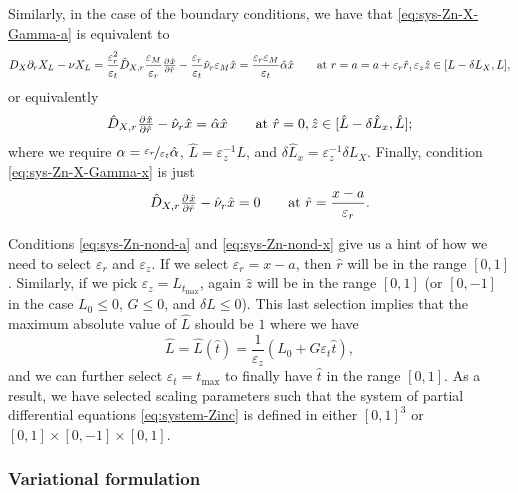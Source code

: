 \documentclass[a4paper,doc,11pt]{article}
\begin{document}
Similarly, in the case of the boundary conditions, we have that \eqref{eq:sys-Zn-X-Gamma-a} is equivalent to
\[
    D_X \partial_r X_L - \nu X_L = 
    \frac{\varepsilon_r^2}{\varepsilon_t} \hat{D}_{X,r} \frac{\varepsilon_M}{\varepsilon_r} \pd{\hat{x}}{\hat{r}} - \frac{\varepsilon_r}{\varepsilon_t} \hat{\nu}_r \varepsilon_M \hat{x} = \frac{\varepsilon_r \varepsilon_M}{\varepsilon_t} \hat{\alpha} \hat{x}
    \qquad \text{at } r = a = a + \varepsilon_r \hat{r}, \varepsilon_z \hat{z} \in [L - \delta L_X, L],
\]
or equivalently
\begin{equation}
    \label{eq:sys-Zn-nond-a}
    \hat{D}_{X,r} \pd{\hat{x}}{\hat{r}} - \hat{\nu}_r \hat{x} = \hat{\alpha} \hat{x}
    \qquad \text{at } \hat{r} = 0, \hat{z} \in [\hat{L} - \delta \hat{L}_x, \hat{L}];
\end{equation}
where we require \( \alpha = \nicefrac{\varepsilon_r}{\varepsilon_t} \hat{\alpha}\), \( \hat{L} = \varepsilon_z^{-1} L\), and \( \delta\hat{L}_x = \varepsilon_z^{-1} \delta L_X\). Finally, condition \eqref{eq:sys-Zn-X-Gamma-x} is just
\begin{equation}
    \label{eq:sys-Zn-nond-x}
    \hat{D}_{X,r} \pd{\hat{x}}{\hat{r}} - \hat{\nu}_r \hat{x} = 0
    \qquad \text{at } \hat{r} = \frac{x-a}{\varepsilon_r}.
\end{equation}

Conditions \eqref{eq:sys-Zn-nond-a} and \eqref{eq:sys-Zn-nond-x} give us a hint of how we need to select \(\varepsilon_r\) and \(\varepsilon_z\). If we select \( \varepsilon_r = x-a\), then \( \hat{r} \) will be in the range \( [0,1]\). Similarly, if we pick \( \varepsilon_z = L_{t_{\max}}\), again \(\hat z \) will be in the range \( [0,1]\) (or \([0,-1]\) in the case \(L_0 \leq 0\), \( G\leq 0\), and \(\delta L \leq 0\)). This last selection implies that the maximum absolute value of \( \hat{L}\) should be \(1\) where we have
\[
    \hat{L} = \hat{L}(\hat t) = \frac{1}{\varepsilon_z} ( L_0 + G \varepsilon_t \hat t ),
\]
and we can further select \( \varepsilon_t = t_{\max}\) to finally have \( \hat t\) in the range \( [0,1]\). As a result, we have selected scaling parameters such that the system of partial differential equations  \eqref{eq:system-Zinc} is defined in either \( [0,1]^3\) or \([0,1]\times [0,-1] \times [0,1]\).


\subsubsection{Variational formulation}
\end{document}
